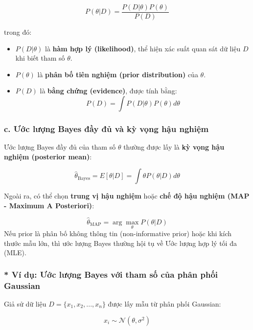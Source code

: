 \begin{equation}
P(\theta | D) = \frac{P(D | \theta) P(\theta)}{P(D)}
\end{equation}

trong đó:
\begin{itemize}
    \item $P(D | \theta)$ là \textbf{hàm hợp lý (likelihood)}, thể hiện xác suất quan sát dữ liệu $D$ khi biết tham số $\theta$.
    \item $P(\theta)$ là \textbf{phân bố tiên nghiệm (prior distribution)} của $\theta$.
    \item $P(D)$ là \textbf{bằng chứng (evidence)}, được tính bằng:
    \begin{equation}
    P(D) = \int P(D | \theta) P(\theta) d\theta
    \end{equation}
\end{itemize}

\subsubsection{c. Ước lượng Bayes đầy đủ và kỳ vọng hậu nghiệm}
Ước lượng Bayes đầy đủ của tham số $\theta$ thường được lấy là \textbf{kỳ vọng hậu nghiệm (posterior mean)}:

\begin{equation}
\hat{\theta}_{\text{Bayes}} = E[\theta | D] = \int \theta P(\theta | D) d\theta
\end{equation}

Ngoài ra, có thể chọn \textbf{trung vị hậu nghiệm} hoặc \textbf{chế độ hậu nghiệm (MAP - Maximum A Posteriori)}:

\begin{equation}
\hat{\theta}_{\text{MAP}} = \arg\max_{\theta} P(\theta | D)
\end{equation}
Nếu prior là phân bố không thông tin (non-informative prior) hoặc khi kích thước mẫu lớn, thì ước lượng Bayes thường hội tụ về Ước lượng hợp lý tối đa (MLE).


\subsubsection{* Ví dụ: Ước lượng Bayes với tham số của phân phối Gaussian}
Giả sử dữ liệu $D = \{x_1, x_2, ..., x_n\}$ được lấy mẫu từ phân phối Gaussian:

\begin{equation}
    x_i \sim \mathcal{N}(\theta, \sigma^2)
\end{equation}

